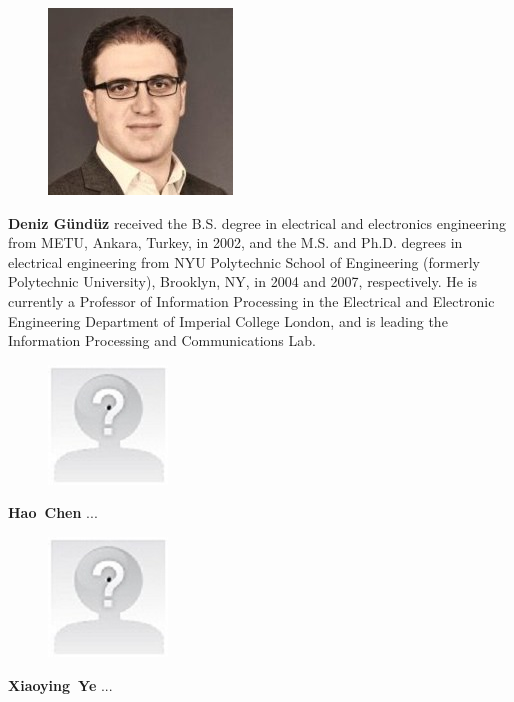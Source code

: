 \documentclass[10pt,a4paper,twocolumn]{article}
\def\startfigure{\vspace{6pt}\begin{figure}[ht]\center}
\begin{document}
\startfigure\includegraphics[width=0.4\columnwidth]{img/deniz_gunduz} 
\end{figure} \textbf{Deniz G\"{u}nd\"{u}z} received the B.S. degree in electrical and electronics engineering from METU, Ankara, Turkey, in 2002, and the M.S. and Ph.D. degrees in electrical engineering from NYU Polytechnic School of Engineering (formerly Polytechnic University), Brooklyn, NY, in 2004 and 2007, respectively. He is currently a Professor of Information Processing in the Electrical and Electronic Engineering Department of Imperial College London, and is leading the Information Processing and Communications Lab.

\startfigure\includegraphics[width=0.4\columnwidth]{img/yourphotofilename} 
\end{figure} \textbf{Hao~Chen} ...

\startfigure\includegraphics[width=0.4\columnwidth]{img/yourphotofilename} 
\end{figure} \textbf{Xiaoying~Ye} ...
\end{document}
